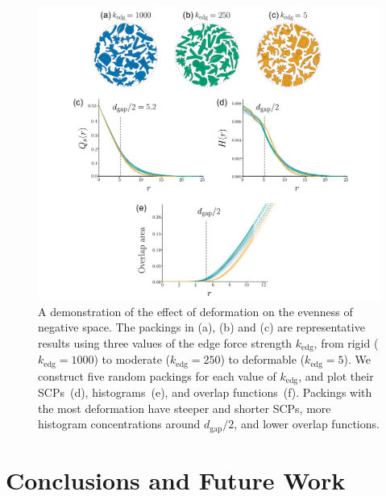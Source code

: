 \begin{figure}
\centering
\includegraphics[width=1.0\textwidth]{figures/metrics/evaluation_big.pdf}
\caption[A demonstration of the effect of deformation \newline on the evenness of negative space]
{\label{fifteen_packings}
A demonstration of the effect of deformation on the evenness of negative space.  
The packings in (a), (b) and (c) are representative results using three values of the edge force strength $k_\mathrm{edg}$,
from rigid ($k_\mathrm{edg}=1000$) to moderate ($k_\mathrm{edg}=250$) to deformable ($k_\mathrm{edg}=5$).
We construct five random packings for each value of $k_\mathrm{edg}$, and plot their SCPs~(d), histograms~(e), and overlap functions~(f).
Packings with the most deformation have steeper and shorter SCPs, 
more histogram concentrations around $d_\mathrm{gap} / 2$, and lower overlap functions.
}
\end{figure}


 \newpage
\section{Conclusions and Future Work}


